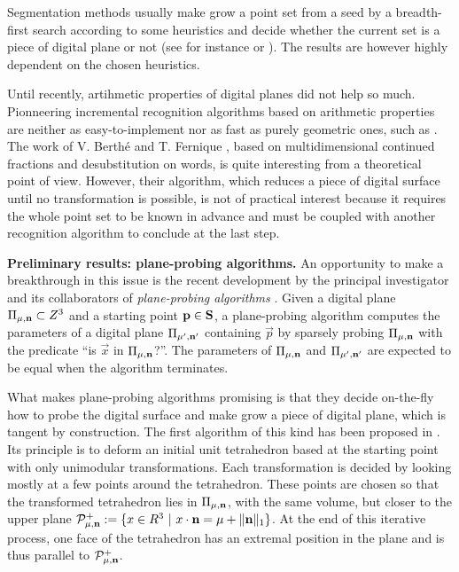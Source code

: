 Segmentation methods usually make grow a point set from a seed by a breadth-first search according
to some heuristics and decide whether the current set is a piece of digital plane or not
(see for instance \cite{Klette2001} or \cite{Sivignon2004}). 
The results are however highly dependent on the chosen heuristics.   

Until recently, artihmetic properties of digital planes did not help so much.
Pionneering incremental recognition algorithms based on arithmetic properties
\cite{Debled1994,Mesmoudi2002} are neither as easy-to-implement nor as fast as
purely geometric ones, such as \cite{Gerard2005}.  
The work of V. Berth\'{e} and T. Fernique \cite{Fernique2009,Berthe2011}, 
based on multidimensional continued fractions and desubstitution on words,
is quite interesting from a theoretical point of view. However, their algorithm,
which reduces a piece of digital surface until no transformation is possible,
is not of practical interest because it requires the whole point set to be known
in advance and must be coupled with another recognition algorithm to conclude
at the last step.  

\noindent\textbf{Preliminary results: plane-probing algorithms.}
An opportunity to make a breakthrough in this issue is the recent development
by the principal investigator and its collaborators of \emph{plane-probing
algorithms} \cite{LPRTCS2016, LPRDGCI2016, LPRJMIV2017}. 
Given a digital plane $\Pi_{\mu,\mathbf{n}} \subset Z^3$
and a starting point $\mathbf{p} \in \mathbf{S}$, 
a plane-probing algorithm computes the parameters of a digital plane $\Pi_{\mu',\mathbf{n}'}$
containing $\vec{p}$ by sparsely probing $\Pi_{\mu,\mathbf{n}}$ with the predicate
``is $\vec{x}$ in $\Pi_{\mu,\mathbf{n}}$?''. The parameters of $\Pi_{\mu,\mathbf{n}}$
and $\Pi_{\mu',\mathbf{n}'}$ are expected to be equal when the algorithm terminates.

What makes plane-probing algorithms promising is that they decide on-the-fly how
to probe the digital surface and make grow a piece of digital plane, which is
tangent by construction. 
The first algorithm of this kind has been proposed in \cite{LPRTCS2016}.
Its principle is to deform an initial unit tetrahedron based at the starting point
with only unimodular transformations. Each transformation is decided by looking
mostly at a few points around the tetrahedron. These points are chosen so that
the transformed tetrahedron lies in $\Pi_{\mu,\mathbf{n}}$, with the same volume,
but closer to the upper plane
$\mathcal{P}^{+}_{\mu,\mathbf{n}} := \{ x \in R^3 \ | \ x \cdot \mathbf{n} = \mu + \|\mathbf{n}\|_1 \}$.
At the end of this iterative process, one face of the tetrahedron has an extremal
position in the plane and is thus parallel to $\mathcal{P}^{+}_{\mu,\mathbf{n}}$.

